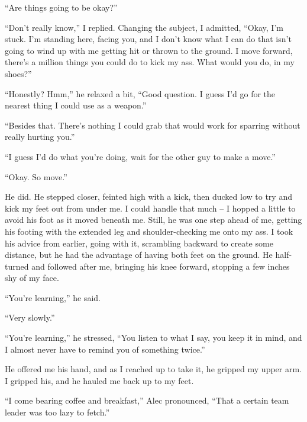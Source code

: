 ``Are things going to be okay?''



``Don't really know,'' I replied.  Changing the subject, I admitted, ``Okay, I'm stuck.  I'm standing here, facing you, and I don't know what I can do that isn't going to wind up with me getting hit or thrown to the ground.  I move forward, there's a million things you could do to kick my ass.  What would you do, in my shoes?''



``Honestly?  Hmm,'' he relaxed a bit, ``Good question.  I guess I'd go for the nearest thing I could use as a weapon.''



``Besides that.  There's nothing I could grab that would work for sparring without really hurting you.''



``I guess I'd do what you're doing, wait for the other guy to make a move.''



``Okay.  So move.''



He did. He stepped closer, feinted high with a kick, then ducked low to try and kick my feet out from under me.  I could handle that much – I hopped a little to avoid his foot as it moved beneath me.  Still, he was one step ahead of me, getting his footing with the extended leg and shoulder-checking me onto my ass.  I took his advice from earlier, going with it, scrambling backward to create some distance, but he had the advantage of having both feet on the ground.  He half-turned and followed after me, bringing his knee forward, stopping a few inches shy of my face.



``You're learning,'' he said.



``Very slowly.''



``You're learning,'' he stressed, ``You listen to what I say, you keep it in mind, and I almost never have to remind you of something twice.''



He offered me his hand, and as I reached up to take it, he gripped my upper arm.  I gripped his, and he hauled me back up to my feet.



``I come bearing coffee and breakfast,'' Alec pronounced, ``That a certain team leader was too lazy to fetch.''



